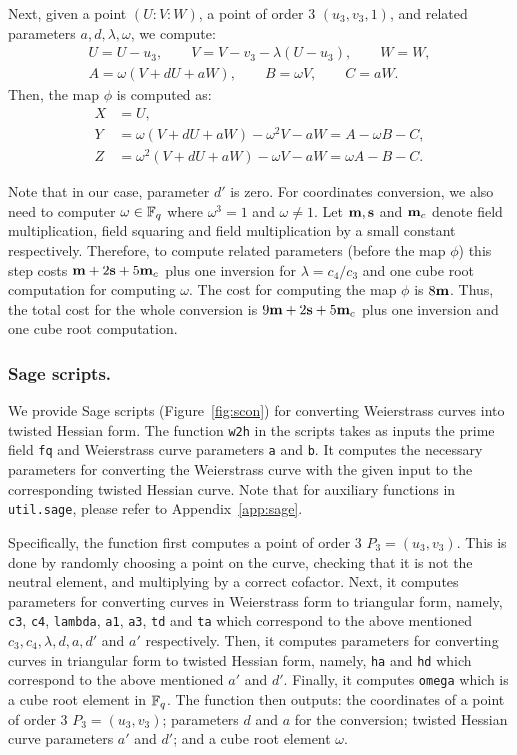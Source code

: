Next,
given a point $(U:V:W)$, a point of order 3 $(u_3,v_3,1)$, and related parameters
$a,d,\lambda,\omega$,
we compute:
\begin{gather*}
U = U - u_3, \qquad
V = V - v_3 - \lambda (U - u_3), \qquad
W = W, \\
A = \omega(V + dU + aW),	\qquad
B = \omega V,	\qquad
C = aW.
\end{gather*}
Then, the map $\phi$ is computed as:
\begin{align*}
X &= U,	\\
Y &= \omega(V + dU + aW) - \omega^2V - aW = A - \omega B - C,	\\
Z &= \omega^2(V + dU + aW) - \omega V - aW = \omega A - B - C.
\end{align*}

Note that in our case, parameter $d'$ is zero.
For coordinates conversion, we also need to computer $\omega \in \mathbb{F}_{q}$
where $\omega^3 = 1$ and $\omega \ne 1$.
Let $\textbf{m}, \textbf{s}$ and $\textbf{m}_{c}$ denote
field multiplication, field squaring and field multiplication by a small constant respectively.
Therefore, to compute related parameters (before the map $\phi$)
this step costs $\textbf{m} + 2\textbf{s} + 5\textbf{m}_{c}$
plus one inversion for $\lambda = c_4 / c_3$
and one cube root computation for computing $\omega$.
The cost for computing the map $\phi$ is $8\textbf{m}$.
Thus, the total cost for the whole conversion is $9\textbf{m} + 2\textbf{s} + 5\textbf{m}_{c}$
plus one inversion and one cube root computation.


\subsubsection{Sage scripts.}
We provide Sage scripts (Figure~\ref{fig:scon})
for converting Weierstrass curves into twisted Hessian form.
The function \texttt{w2h} in the scripts takes as inputs
the prime field \texttt{fq} and
Weierstrass curve parameters \texttt{a} and \texttt{b}.
It computes the necessary parameters for converting the Weierstrass curve
with the given input to the corresponding twisted Hessian curve.
Note that for auxiliary functions in \texttt{util.sage}, please refer to Appendix~\ref{app:sage}.

Specifically, the function first computes a point of order 3 $P_3 = (u_3,v_3)$.
This is done by randomly choosing a point on the curve,
checking that it is not the neutral element,
and multiplying by a correct cofactor.
Next, it computes parameters for converting curves in Weierstrass form to triangular form,
namely, \texttt{c3}, \texttt{c4}, \texttt{lambda}, \texttt{a1}, \texttt{a3}, \texttt{td} and \texttt{ta}
which correspond to the above mentioned $c_3, c_4, \lambda, d, a, d'$ and $a'$ respectively.
Then, it computes parameters for converting curves in triangular form to twisted Hessian form,
namely, \texttt{ha} and \texttt{hd} which correspond to the above mentioned $a'$ and $d'$.
Finally, it computes \texttt{omega} which is a cube root element in $\mathbb{F}_{q}$.
The function then outputs:
the coordinates of a point of order 3 $P_3 = (u_3,v_3)$;
parameters $d$ and $a$ for the conversion;
twisted Hessian curve parameters $a'$ and $d'$;
and a cube root element $\omega$.


